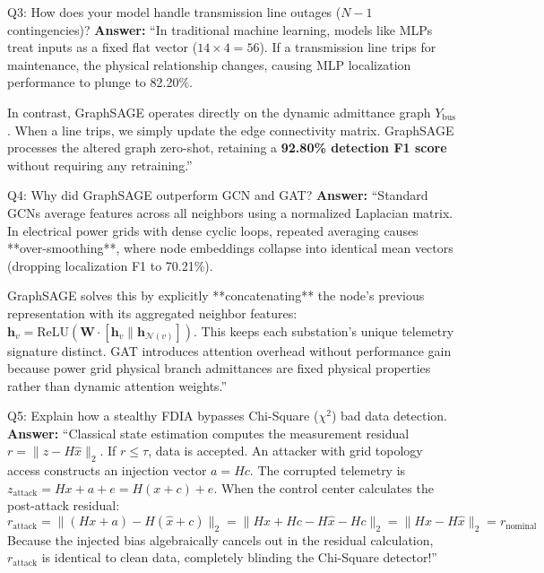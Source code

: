 \documentclass[10pt,a4paper]{article}
\begin{document}
\begin{qabox}{Q3: How does your model handle transmission line outages ($N-1$ contingencies)?}
\textbf{Answer:}
``In traditional machine learning, models like MLPs treat inputs as a fixed flat vector ($14 \times 4 = 56$). If a transmission line trips for maintenance, the physical relationship changes, causing MLP localization performance to plunge to 82.20\%. 

In contrast, GraphSAGE operates directly on the dynamic admittance graph $Y_{\text{bus}}$. When a line trips, we simply update the edge connectivity matrix. GraphSAGE processes the altered graph zero-shot, retaining a \textbf{92.80\% detection F1 score} without requiring any retraining.''
\end{qabox}

\begin{qabox}{Q4: Why did GraphSAGE outperform GCN and GAT?}
\textbf{Answer:}
``Standard GCNs average features across all neighbors using a normalized Laplacian matrix. In electrical power grids with dense cyclic loops, repeated averaging causes **over-smoothing**, where node embeddings collapse into identical mean vectors (dropping localization F1 to 70.21\%). 

GraphSAGE solves this by explicitly **concatenating** the node's previous representation with its aggregated neighbor features: $\mathbf{h}_v = \text{ReLU}(\mathbf{W} \cdot [\mathbf{h}_v \| \mathbf{h}_{\mathcal{N}(v)}])$. This keeps each substation's unique telemetry signature distinct. GAT introduces attention overhead without performance gain because power grid physical branch admittances are fixed physical properties rather than dynamic attention weights.''
\end{qabox}

\begin{qabox}{Q5: Explain how a stealthy FDIA bypasses Chi-Square ($\chi^2$) bad data detection.}
\textbf{Answer:}
``Classical state estimation computes the measurement residual $r = \|z - H\hat{x}\|_2$. If $r \le \tau$, data is accepted. An attacker with grid topology access constructs an injection vector $a = Hc$. The corrupted telemetry is $z_{\text{attack}} = Hx + a + e = H(x+c) + e$. When the control center calculates the post-attack residual:
\[
r_{\text{attack}} = \|(Hx + a) - H(\hat{x} + c)\|_2 = \|Hx + Hc - H\hat{x} - Hc\|_2 = \|Hx - H\hat{x}\|_2 = r_{\text{nominal}}
\]
Because the injected bias algebraically cancels out in the residual calculation, $r_{\text{attack}}$ is identical to clean data, completely blinding the Chi-Square detector!''
\end{qabox}
\end{document}
